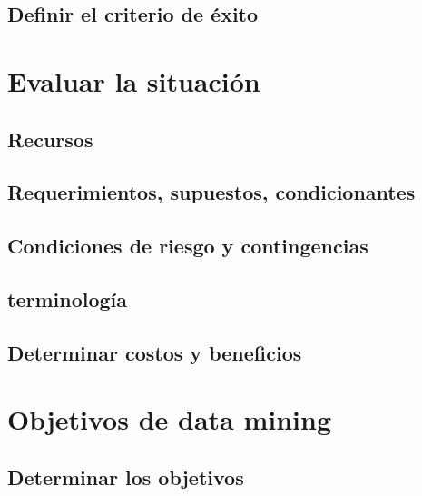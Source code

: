 \documentclass[11pt,a4paper,twoside]{tesis}
\begin{document}
\subsection{Definir el criterio de éxito}
\section{Evaluar la situación}
\subsection{Recursos}
\subsection{Requerimientos, supuestos, condicionantes}
\subsection{Condiciones de riesgo y contingencias}
\subsection{terminología}
\subsection{Determinar costos y beneficios}

\section{Objetivos de data mining}
\subsection{Determinar los objetivos}
\end{document}
